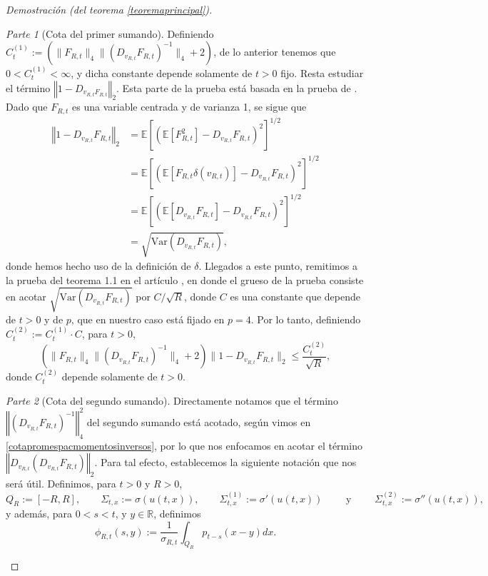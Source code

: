 \documentclass[letterpaper,twoside,12pt]{book}
\newcommand{\R}{\mathbb{R}}
\newcommand{\E}{\mathbb{E}}
\newcommand{\1}{\mathds{1}}
\newcommand{\norm}[1]{\left\Vert #1 \right\Vert}
\theoremstyle{definition}
\theoremstyle{definition}
\theoremstyle{remark}
\newtheorem{proofpart}{Parte}
\theoremstyle{definition}
\theoremstyle{definition}
\theoremstyle{definition}
\theoremstyle{definition}
\theoremstyle{definition}
\begin{document}
\begin{proof}[Demostración (del teorema \ref{teoremaprincipal})]
\begin{proofpart}[Cota del primer sumando]
Definiendo $C_{t}^{(1)}:=\left(\|F_{R,t}\|_4\|\left(D_{v_{R,t}}F_{R,t}\right)^{-1}\|_4+2\right)$, de lo anterior tenemos que $0<C_{t}^{(1)}<\infty$, y dicha constante depende solamente de $t>0$ fijo. Resta estudiar el término $\norm{1-D_{v_{R,t}F_{R,t}}}_2$. Esta parte de la prueba está basada en la prueba de \cite[teorema 1.1]{HUANG20207170}. Dado que $F_{R,t}$ es una variable centrada y de varianza 1, se sigue que 
\begin{align*}
   \norm{1-D_{v_{R,t}}F_{R,t}}_2&=\E\left[(\E\left[F_{R,t}^2\right]-D_{v_{R,t}}F_{R,t})^2\right]^{1/2}\\
   &=\E\left[(\E\left[F_{R,t}\delta(v_{R,t})\right]-D_{v_{R,t}}F_{R,t})^2\right]^{1/2}\\
   &=\E\left[(\E\left[D_{v_{R,t}}F_{R,t}\right]-D_{v_{R,t}}F_{R,t})^2\right]^{1/2}\\
   &=\sqrt{\text{Var}\left(D_{v_{R,t}}F_{R,t}\right)},
\end{align*}
donde hemos hecho uso de la definición de $\delta$. Llegados a este punto, remitimos a la prueba del teorema 1.1 en el artículo \cite{HUANG20207170}, en donde el grueso de la prueba consiste en acotar $\sqrt{\text{Var}\left(D_{v_{R,t}}F_{R,t}\right)}$ por $C/\sqrt{R}$, donde $C$ es una constante que depende de $t>0$ y de $p$, que en nuestro caso está fijado en $p=4$. Por lo tanto, definiendo $C_{t}^{(2)}:=C_{t}^{(1)}\cdot C$, para $t>0$,
\begin{equation}\label{cotaprimersumando}
   \left(\|F_{R,t}\|_4\|\left(D_{v_{R,t}}F_{R,t}\right)^{-1}\|_4+2\right)\|1-D_{v_{R,t}}F_{R,t}\|_2\leq \frac{C_{t}^{(2)}}{\sqrt{R}},
\end{equation}
donde $C_{t}^{(2)}$ depende solamente de $t>0$.
\end{proofpart}
\begin{proofpart}[Cota del segundo sumando]
Directamente notamos que el término $\norm{(D_{v_{R,t}}F_{R,t})^{-1}}^2_4$ del segundo sumando está acotado, según vimos en \eqref{cotapromespacmomentosinversos}, por lo que nos enfocamos en acotar el término $\norm{D_{v_{R,t}}(D_{v_{R,t}}F_{R,t})}_2$. 
Para tal efecto, establecemos la siguiente notación que nos será útil. Definimos, para $t>0$ y $R>0$, 
\[
Q_R:=[-R,R], \qquad \Sigma_{t,x}:=\sigma(u(t,x)), \qquad \Sigma_{t,x}^{(1)}:=\sigma'(u(t,x)) \qquad \text{ y } \qquad \Sigma_{t,x}^{(2)}:=\sigma''(u(t,x)),
\]
y además, para $0<s<t$, y $y\in \R$, definimos  
\begin{equation}\label{defnotacionphi}
   \phi_{R,t}(s,y):=\frac{1}{\sigma_{R,t}}\int_{Q_R}p_{t-s}(x-y)dx.
\end{equation}


\end{proofpart}
\end{proof}
\end{document}
